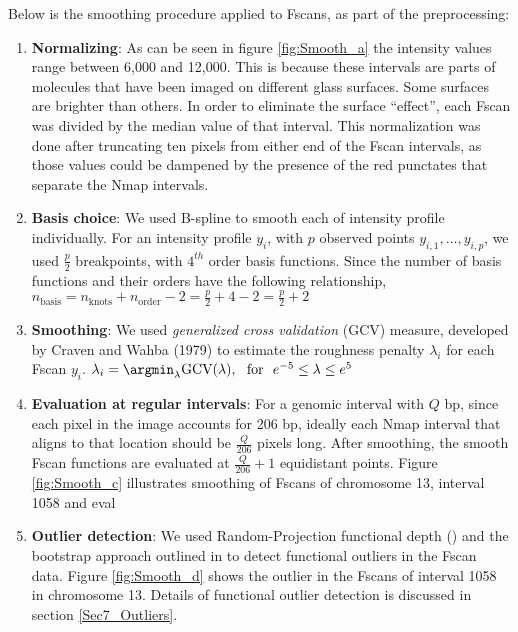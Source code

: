 Below is the smoothing procedure applied to Fscans, as part of the preprocessing:
\begin{enumerate}
\item {\bf{Normalizing}}: As can be seen in figure \ref{fig:Smooth_a} the intensity values range between 6,000 and 12,000. This is because these intervals are parts of molecules that have been imaged on different glass surfaces. Some surfaces are brighter than others. In order to eliminate the surface ``effect'', each Fscan was divided by the median value of that interval. This normalization was done after truncating ten pixels from either end of the Fscan intervals, as those values could be dampened by the presence of the red punctates that separate the Nmap intervals.
\item {\bf{Basis choice}}: We used B-spline \cite{deBoor_1978_Splines} to smooth each of intensity profile individually. For an intensity profile $y_i$, with $p$ observed points $y_{i,1}, \dots, y_{i,p}$, we used $\frac{p}{2}$ breakpoints, with $4^{th}$ order basis functions. Since the number of basis functions and their orders have the following relationship, $ n_{\text{basis}} = n_{\text{knots}} + n_{\text{order}} - 2 = \frac{p}{2} + 4 - 2 = \frac{p}{2} + 2 $
\item {\bf{Smoothing}}: We used {\emph{generalized cross validation}} (GCV) measure, developed by Craven and Wahba (1979) \cite{Craven_Wahba_1978_NumMath} to estimate the roughness penalty $\lambda_{i}$ for each Fscan $y_i$. $ \lambda_i = \argmin_{\lambda} \text{GCV}(\lambda), \ \ \text{for\ \ } e^{-5} \leq \lambda \leq e^5 $
\item {\bf{Evaluation at regular intervals}}: For a genomic interval with $Q$ bp, since each pixel in the image accounts for 206 bp, ideally each Nmap interval that aligns to that location should be $\frac{Q}{206}$ pixels long. After smoothing, the smooth Fscan functions are evaluated at $\frac{Q}{206} + 1$ equidistant points. Figure \ref{fig:Smooth_c} illustrates smoothing of Fscans of chromosome 13, interval 1058 and eval
\item {\bf{Outlier detection}}: We used Random-Projection functional depth (\cite{Cuevas_etal_2007_CSDA}) and the bootstrap approach outlined in \cite{Febrero-Bande_etal_2007_Environmetrics} to detect functional outliers in the Fscan data. Figure \ref{fig:Smooth_d} shows the outlier in the Fscans of interval 1058 in chromosome 13. Details of functional outlier detection is discussed in section \ref{Sec7_Outliers}. 
\end{enumerate}


